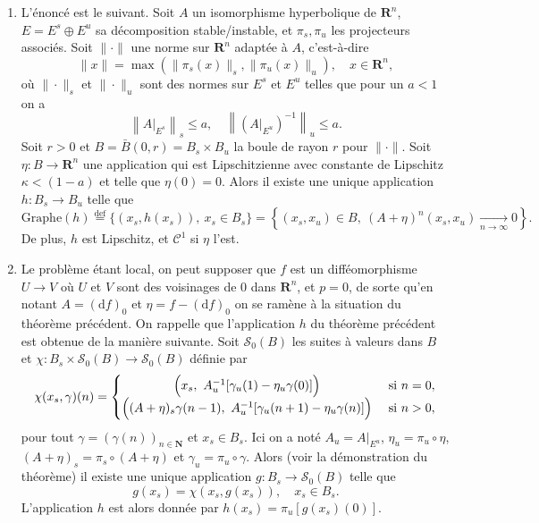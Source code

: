 \documentclass[a4paper,12pt,openany]{article}
\theoremstyle{plain}
\theoremstyle{definition}
\newcommand{\dd}{\mathrm{d}}
\newcommand{\R}{\mathbf{R}}
\newcommand{\N}{\mathbf{N}}
\begin{document}
\begin{enumerate}
\item L'\'enonc\'e est le suivant. Soit $A$ un isomorphisme hyperbolique de $\R^n$, $E = E^s \oplus E^u$ sa d\'ecomposition stable/instable, et $\pi_s, \pi_u$ les projecteurs associ\'es. Soit $\|\cdot\|$ une norme sur $\R^n$ adapt\'ee \`a $A$, c'est-\`a-dire
$$
\|x\| = \max\left(\|\pi_s(x)\|_s, \|\pi_u(x)\|_u\right), \quad x \in \R^n,
$$
o\`u $\|\cdot\|_s$ et $\|\cdot\|_u$ sont des normes sur $E^s$ et $E^u$ telles que pour un $a < 1$ on a 
$$
\left\|A|_{E^s}\right\|_s \leq a, \quad \left\|(A|_{E^u})^{-1}\right\|_u \leq a.
$$
Soit $r>0$ et $B = \bar{B}(0,r) = B_s \times B_u$ la boule de rayon $r$ pour $\|\cdot\|$. Soit $\eta : B \to \R^n$ une application qui est Lipschitzienne avec constante de Lipschitz $\kappa < (1-a)$ et telle que $\eta(0) = 0.$ Alors il existe une unique application $h : B_s \to B_u$ telle que
$$
\mathrm{Graphe}(h) \overset{\text{def}}{=} \{(x_s, h(x_s)),~x_s \in B_s\} =\left \{ (x_s, x_u) \in B,~ (A+\eta)^n(x_s,x_u) \underset{n \to \infty}{\longrightarrow} 0 \right\}.
$$
De plus, $h$ est Lipschitz, et $\mathcal{C}^1$ si $\eta$ l'est.

\item Le probl\`eme \'etant local, on peut supposer que $f$ est un diff\'eomorphisme $U \to V$ o\`u $U$ et $V$ sont des voisinages de $0$ dans $\R^n$, et $p=0$, de sorte qu'en notant $A = (\dd f)_0$ et $\eta = f - (\dd f)_0$ on se ram\`ene \`a la situation du th\'eor\`eme pr\'ec\'edent. On rappelle que l'application $h$ du th\'eor\`eme pr\'ec\'edent est obtenue de la mani\`ere suivante. Soit $\mathcal{S}_0(B)$ les suites \`a valeurs dans $B$ et $\chi : B_s \times \mathcal{S}_0(B) \to \mathcal{S}_0(B)$ d\'efinie par 
\begin{equation}\label{eq:defchi}
\chi(x_s, \gamma)(n) =  \left\{
\begin{matrix} \Bigl(x_s, ~A_u^{-1} [\gamma_u(1) - \eta_u\gamma(0)]\Bigr) &\text{ si } n =0, \\
\Bigl((A+\eta)_s\gamma(n-1), ~A_u^{-1}[\gamma_u(n+1) - \eta_u \gamma(n)] \Bigr) &\text{ si }n >0,
\end{matrix} \right.
\end{equation}
pour tout $\gamma = (\gamma(n))_{n \in \N}$ et $x_s \in B_s$. Ici on a not\'e $A_u = A|_{E^u}$, $\eta_u = \pi_u \circ \eta$, $(A+\eta)_s = \pi_s \circ (A+\eta)$ et $\gamma_u = \pi_u \circ \gamma$. Alors (voir la d\'emonstration du th\'eor\`eme) il existe une unique application $g : B_s \to \mathcal{S}_0(B)$ telle que 
\begin{equation}\label{eq:fixpoint0}
g(x_s) = \chi(x_s, g(x_s)), \quad x_s \in B_s.
\end{equation}
L'application $h$ est alors donn\'ee par $h(x_s) = \pi_u[g(x_s)(0)].$ 


\end{enumerate}
\end{document}
